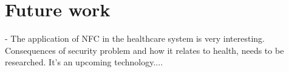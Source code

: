 \chapter{Future work}
\label{chap:future_work}

- The application of NFC in the healthcare system is very interesting. Consequences of security problem and how it relates to health, needs to be researched. It's an upcoming technology....
